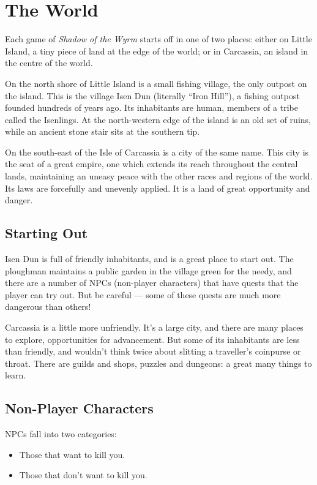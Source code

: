 \section{The World}

Each game of {\it Shadow of the Wyrm} starts off in one of two places: 
either on Little Island, a tiny piece of land at the edge of the world;
or in Carcassia, an island in the centre of the world.

On the north shore of Little Island is a small fishing village, the only
outpost on the island.  This is the village Isen Dun (literally 
``Iron Hill''), a fishing outpost founded hundreds of years ago.  Its
inhabitants are human, members of a tribe called the Isenlings.  At the 
north-western edge of the island is an old set of ruins, while an ancient
stone stair sits at the southern tip.

On the south-east of the Isle of Carcassia is a city of the same name.  
This city is the seat of a great empire, one which extends its reach 
throughout the central lands, maintaining an uneasy peace with the other 
races and regions of the world.  Its laws are forcefully and unevenly applied.
It is a land of great opportunity and danger.

\subsection{Starting Out}

Isen Dun is full of friendly inhabitants, and is a great place to start
out.  The ploughman maintains a public garden in the village green for the
needy, and there are a number of NPCs (non-player characters) that have
quests that the player can try out.  But be careful --- some of these quests
are much more dangerous than others! 

Carcassia is a little more unfriendly.  It's a large city, and there are
many places to explore, opportunities for advancement.  But some of its
inhabitants are less than friendly, and wouldn't think twice about 
slitting a traveller's coinpurse or throat.  There are guilds and shops,
puzzles and dungeons: a great many things to learn.

\subsection{Non-Player Characters}

NPCs fall into two categories:

\begin{itemize}
\item Those that want to kill you.
\item Those that don't want to kill you.
\end{itemize}


